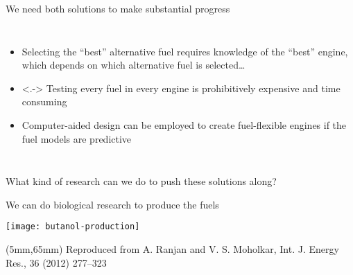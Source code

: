\documentclass{beamer}
\begin{document}
\begin{frame}{We need both solutions to make substantial progress}
    \begin{columns}
            \begin{itemize}
                \item<+-> Selecting the ``best'' alternative fuel requires knowledge
                    of the ``best'' engine, which depends on which
                    alternative fuel is selected\ldots
                \item<.-> Testing every fuel in every engine is prohibitively expensive
                    and time consuming
                \item<+-> Computer-aided design can be employed to create fuel-flexible
                    engines \alert{if the fuel models are predictive}
            \end{itemize}
            \centering
    \end{columns}
\end{frame}

\begin{frame}
    \begin{center}
        {\Large What kind of research can we do to push these solutions along?}
    \end{center}
\end{frame}

\begin{frame}{We can do biological research to produce the fuels}
    \begin{center}
        \texttt{[image: butanol-production]}
    \end{center}
    \begin{textblock*}{50mm}(5mm,65mm)
        {\tiny Reproduced from A. Ranjan and V. S. Moholkar, Int. J. Energy Res., 36 (2012) 277--323}
    \end{textblock*}
\end{frame}
\end{document}
